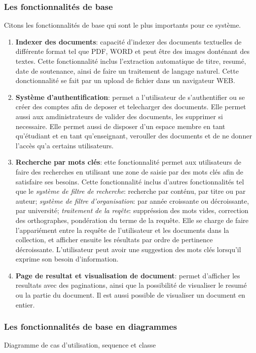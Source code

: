 \subsubsection{Les fonctionnalités de base}
Citons les fonctionnalités de base qui sont le plus importants pour ce système.
\begin{enumerate}
    \item \textbf{Indexer des documents}: capacité d'indexer des documents textuelles de différente format tel que PDF, WORD et peut être des images donténant des textes. Cette fonctionnalité inclus l'extraction automatique de titre, resumé, date de soutenance, ainsi de faire un traitement de langage naturel. Cette donctionnalité se fait par un upload de fichier dans un navigateur WEB\@.
    \item \textbf{Système d'authentification}: permet a l'utilisateur de s'authentifier ou se créer des comptes afin de deposer et telecharger des documents. Elle permet aussi aux amdinistrateurs de valider des documents, les supprimer si necessaire. Elle permet aussi de disposer d'un espace membre en tant qu'étudiant et en tant qu'enseignant, verouller des documents et de ne donner l'accès qu'a certains utilisateurs.
    \item \textbf{Recherche par mots clés}: ette fonctionnalité permet aux utilisateurs de faire des recherches en utilisant une zone de saisie par des mots clés afin de satisfaire ses besoins. Cette fonctionnalité inclus d'autres fonctionnalités tel que le \emph{système de filtre de recherche}: recherche par conténu, par titre ou par auteur; \emph{système de filtre d'organisation}: par année croissante ou décroissante, par université; \emph{traitement de la reqête}: suppréssion des mots vides, correction des orthographes, pondération du terme de la requête. Elle se charge de faire l'appariément entre la requête de l'utilisateur et les documents dans la collection, et afficher ensuite les résultats par ordre de pertinence décroissante. L'utilisateur peut avoir une suggestion des mots clés lorsqu'il exprime son besoin d'information.
    \item \textbf{Page de resultat et visualisation de document}: permet d'afficher les resultats avec des paginations, ainsi que la possibilité de visualiser le resumé ou la partie du document. Il est aussi possible de visualiser un document en entier.
\end{enumerate}

\subsubsection{Les fonctionnalités de base en diagrammes}
Diagramme de cas d'utilisation, sequence et classe

